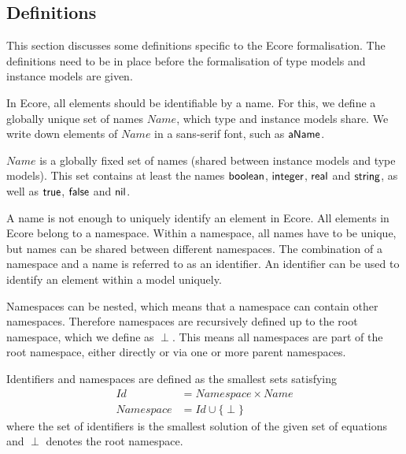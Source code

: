 \subsection{Definitions}
\label{subsec:formalisations:ecore_formalisation:definitions}
This section discusses some definitions specific to the Ecore formalisation. The definitions need to be in place before the formalisation of type models and instance models are given.

In Ecore, all elements should be identifiable by a name. For this, we define a globally unique set of names $N\!ame$, which type and instance models share. We write down elements of $N\!ame$ in a sans-serif font, such as $\mathsf{aName}$.

\begin{defin}[Name]
\label{defin:formalisations:ecore_formalisation:definitions:name}
$Name$ is a globally fixed set of names (shared between instance models and type models). This set
contains at least the names $\mathsf{boolean}$, $\mathsf{integer}$, $\mathsf{real}$ and $\mathsf{string}$, as well as $\mathsf{true}$, $\mathsf{false}$ and $\mathsf{nil}$.
\end{defin}

A name is not enough to uniquely identify an element in Ecore. All elements in Ecore belong to a namespace. Within a namespace, all names have to be unique, but names can be shared between different namespaces. The combination of a namespace and a name is referred to as an identifier. An identifier can be used to identify an element within a model uniquely.

Namespaces can be nested, which means that a namespace can contain other namespaces. Therefore namespaces are recursively defined up to the root namespace, which we define as $\perp$. This means all namespaces are part of the root namespace, either directly or via one or more parent namespaces.

\begin{defin}
\label{defin:formalisations:ecore_formalisation:definitions:identifiers_namespaces}
Identifiers and namespaces are defined as the smallest sets satisfying
\begin{align*}
    Id &= Namespace \times N\!ame\\
    N\!amespace &= Id \cup \{\perp\}
\end{align*}
where the set of identifiers is the smallest solution of the given set of equations and $\perp$ denotes the root namespace.
\end{defin}

